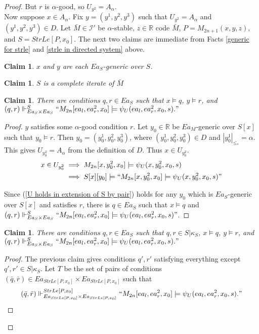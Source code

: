 \documentclass[12pt]{article}
\newtheorem{claim}[theorem]{Claim}
\newcommand\I{\mathcal{I}}
\newcommand\R{\mathbb{R}}
\begin{document}
{\begin{proof}
    But $r$ is $\alpha$-good, so $U_{y^2} = A_\alpha$.\\

    Now suppose $x\in A_\alpha$. Fix $y = (y^1,y^2,y^3)$ such that $U_{y^2} = A_\alpha$ and $(y^1,y^2,y^3)\in D$. Let $\bar{M}\in\I'$ be $\alpha$-stable, $z\in \R$ code $\bar{M}$, $P = M_{2n+1}(x,y,z)$, and $S = StrLe[P,x_0]$. The next two claims are immediate from Facts \ref{generic for strle} and \ref{strle in directed system} above.

    \begin{claim}
        $x$ and $y$ are each $Ea_S$-generic over $S$.
    \end{claim}

    \begin{claim}
        $S$ is a complete iterate of $\bar{M}$
    \end{claim}

    \begin{claim}
        There are conditions $q,r\in Ea_S$ such that $x\models q$, $y\models r$, and $(q,r) \Vdash^S_{Ea_S\times Ea_S} ``M_{2n}[ea_l,ea_r^2,x_0]\models \psi_U(ea_l,ea_r^2,x_0,s)."$
    \end{claim}
    \begin{proof}
        $y$ satisfies some $\alpha$-good condition $r$. Let $y_0\in\R$ be $Ea_M$-generic over $S[x]$ such that $y_0\models r$. Then $y_0 = (y_0^1,y_0^2,y_0^3)$, where $(y_0^1,y_0^2,y_0^3)\in D$ and $|y^1_0|_{\leq_*} = \alpha$. This gives $U_{y_0^2} = A_\alpha$ from the definition of $D$. Thus $x\in U_{y_0^2}$.
        \begin{align}
            x\in U_{y_0^2} &\implies M_{2n}[x,y_0^2,x_0] \models \psi_U(x,y_0^2,x_0,s)\\
            &\label{U holds in extension of S by pair}\implies S[x][y_0]\models ``M_{2n}[x,y_0^2,x_0]\models \psi_U(x,y_0^2,x_0,s)"
        \end{align}

        Since (\ref{U holds in extension of S by pair}) holds for any $y_0$ which is $Ea_S$-generic over $S[x]$ and satisfies $r$, there is $q\in Ea_S$ such that $x\models q$ and $(q,r) \Vdash^S_{Ea_S\times Ea_S} ``M_{2n}[ea_l,ea_r^2, x_0]\models \psi_U(ea_l,ea_r^2,x_0,s)"$.
    \end{proof}

    \begin{claim}
           There are conditions $q,r\in Ea_S$ such that $q,r\in S|\kappa_S$, $x\models q$, $y\models r$, and $(q,r) \Vdash^S_{Ea_S\times Ea_S} ``M_{2n}[ea_l,ea_r^2,x_0]\models \psi_U(ea_l,ea_r^2,x_0,s)."$
    \end{claim}
    \begin{proof}
        The previous claim gives conditions $q',r'$ satisfying everything except $q',r'\in S|\kappa_S$. Let $T$ be the set of pairs of conditions $(\bar{q},\bar{r})\in Ea_{StrLe[P,x_0]}\times Ea_{StrLe[P,x_0]}$ such that
        \begin{align*}
            (\bar{q},\bar{r}) \Vdash^{StrLe[P,x_0]}_{Ea_{StrLe[P,x_0]}\times Ea_{StrLe[P,x_0]}} ``M_{2n}[ea_l,ea_r^2,x_0] \models \psi_U(ea_l,ea_r^2,x_0,s)."
        \end{align*}


\end{proof}
\end{proof}}
\end{document}
